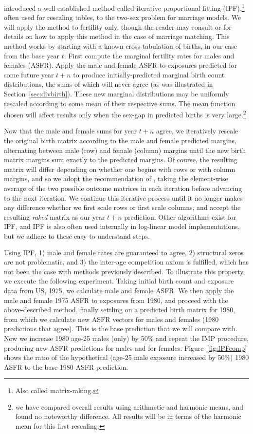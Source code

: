 \FloatBarrier
\label{sec:IPF}
\citet{mc1975models} introduced a well-established method called iterative
proportional fitting (IPF),\footnote{Also called matrix-raking.} often used for
rescaling tables, to the two-sex problem for marriage models. We will apply
the method to fertility only, though the reader may consult
\citet{mc1975models} or \citet{Matthews2013} for details on how to apply
this method in the case of marriage matching. This method works by starting with
a known cross-tabulation of births, in our case from the base year $t$. First compute 
the marginal fertility rates for males and females (ASFR). Apply the male and
female ASFR to exposures predicted for some future year $t+n$ to produce
initially-predicted marginal birth count distributions, the sums of which will 
never agree (as was illustrated in Section~\ref{sec:divbirth}). These new
marginal distributions may be uniformly rescaled according to some mean of their
respective sums. The mean function chosen will affect results only when the
sex-gap in predicted births is very large.\footnote{we have compared overall
results using arithmetic and harmonic means, and found no noteworthy difference. 
All results will be in terms of the harmonic mean for this first rescaling.}

Now that the male and female sums for year $t+n$ agree, we iteratively
rescale the original birth matrix according to the male and female
predicted margins, alternating between male (row) and female (column) margins
until the new birth matrix margins sum exactly to the predicted margins. Of
course, the resulting matrix will differ depending on whether one begins with
rows or with column margins, and so we adopt the recommendation of
\citet{Matthews2013}, taking the element-wise average of the two
possible outcome matrices in each iteration before advancing to the next
iteration. We continue this iterative process until it no longer makes any
difference whether we first scale rows or first scale columns, and accept the
resulting \textit{raked} matrix as our year $t+n$ prediction. Other algorithms
exist for IPF, and IPF is also often used internally in log-linear model
implementations, but we adhere to these easy-to-understand steps.

Using IPF, 1) male and female rates are guaranteed to agree, 2) structural zeros
are not problematic, and 3) the inter-age competition axiom is fulfilled,
which has not been the case with methods previously described. To illustrate
this property, we execute the following experiment. Taking initial birth count
and exposure data from US, 1975, we calculate male and female ASFR. We then
apply the male and female 1975 ASFR to exposures from 1980, and proceed with the
above-described method, finally settling on a predicted birth matrix for 1980,
from which we calculate new ASFR vectors for males and females (1980
predictions that agree). This is the base prediction that we will compare with.
Now we increase 1980 age-25 males (only) by 50\% and repeat the IMP procedure,
producing new ASFR predictions for males and for females.
Figure~\ref{fig:IPFcomp} shows the ratio of the hypothetical (age-25 male
exposure increased by 50\%) 1980 ASFR to the base 1980 ASFR prediction.

